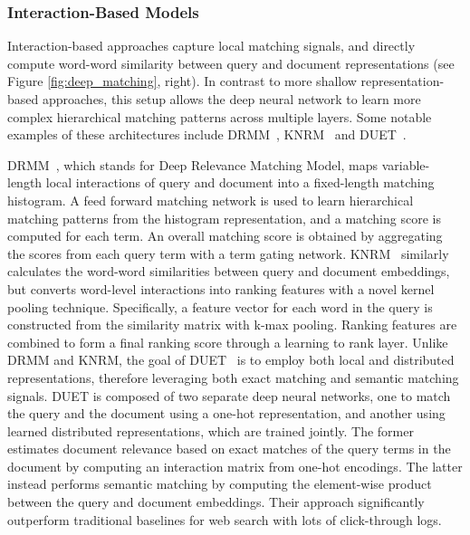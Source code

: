 \subsubsection{Interaction-Based Models}

Interaction-based approaches capture local matching signals, and directly compute word-word similarity between query and document representations (see Figure \ref{fig:deep_matching}, right).
In contrast to more shallow representation-based approaches, this setup allows the deep neural network to learn more complex hierarchical matching patterns across multiple layers.
Some notable examples of these architectures include DRMM~\cite{guo2016deep}, KNRM~\cite{xiong2017knrm} and DUET~\cite{mitra2017learning}.

DRMM~\cite{guo2016deep}, which stands for Deep Relevance Matching Model, maps variable-length local interactions of query and document into a fixed-length matching histogram.
A feed forward matching network is used to learn hierarchical matching patterns from the histogram representation, and a matching score is computed for each term.
An overall matching score is obtained by aggregating the scores from each query term with a term gating network.
KNRM~\cite{xiong2017knrm} similarly calculates the word-word similarities between query and document embeddings, but converts word-level interactions into ranking features with a novel kernel pooling technique.
Specifically, a feature vector for each word in the query is constructed from the similarity matrix with k-max pooling.
Ranking features are combined to form a final ranking score through a learning to rank layer.
Unlike DRMM and KNRM, the goal of DUET~\cite{mitra2017learning} is to employ both local and distributed representations, therefore leveraging both exact matching and semantic matching signals.
DUET is composed of two separate deep neural networks, one to match the query and the document using a one-hot representation, and another using learned distributed representations, which are trained jointly.
The former estimates document relevance based on exact matches of the query terms in the document by computing an interaction matrix from one-hot encodings.
The latter instead performs semantic matching by computing the element-wise product between the query and document embeddings.
Their approach significantly outperform traditional baselines for web search with lots of click-through logs.

